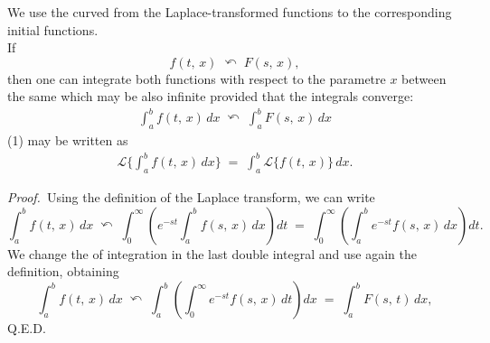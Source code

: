 \documentclass[12pt]{article}
\theoremstyle{definition}
\begin{document}
We use the curved  from the Laplace-transformed functions to the corresponding initial functions.\\

If\, 
$$f(t,\,x) \;\curvearrowleft\; F(s,\,x),$$
then one can integrate both functions with respect to the parametre $x$ between the same  which may be also infinite provided that the integrals converge:
\begin{align}
\int_a^b\!f(t,\,x)\,dx \;\curvearrowleft\; \int_a^b\!F(s,\,x)\,dx
\end{align}
(1) may be written as 
\begin{align}
\mathcal{L}\{\int_a^b\!f(t,\,x)\,dx\} \;=\; \int_a^b\!\mathcal{L}\{f(t,\,x)\}\,dx.
\end{align}



{\em Proof.}\, Using the definition of the Laplace transform, we can write
$$\int_a^b\!f(t,\,x)\,dx \;\curvearrowleft\; \int_0^\infty\left(e^{-st}\int_a^b\!f(s,\,x)\,dx\right)dt
\;=\; \int_0^\infty\left(\int_a^b\!e^{-st}f(s,\,x)\,dx\right)dt.$$
We change the  of integration in the last double integral and use again the definition, obtaining
$$\int_a^b\!f(t,\,x)\,dx \;\curvearrowleft\; 
\int_a^b\left(\int_0^\infty\!e^{-st}f(s,\,x)\,dt\right)dx \;=\; \int_a^b\!F(s,\,t)\,dx,$$
Q.E.D.


\end{document}
